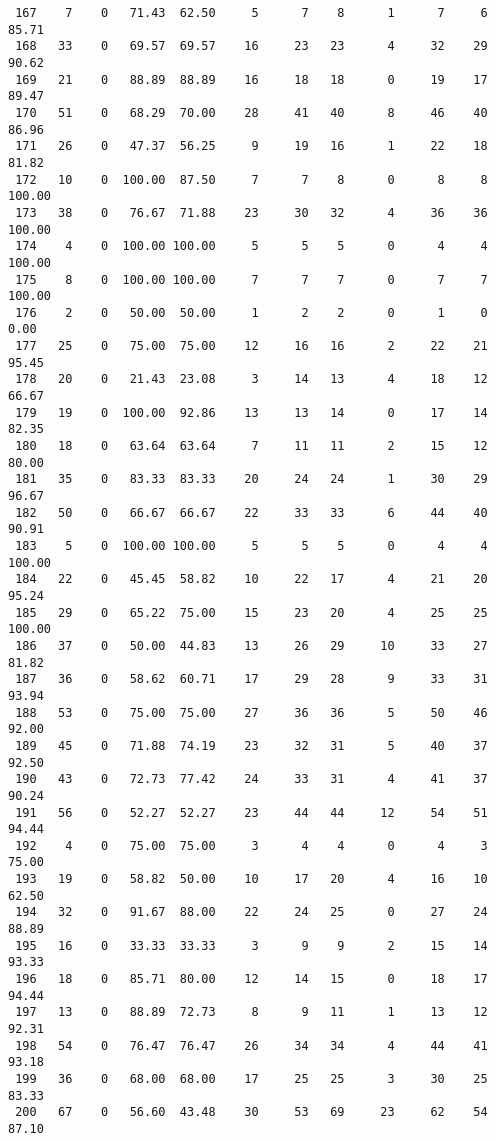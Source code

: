 \begin{verbatim}
 167    7    0   71.43  62.50     5      7    8      1      7     6    85.71
 168   33    0   69.57  69.57    16     23   23      4     32    29    90.62
 169   21    0   88.89  88.89    16     18   18      0     19    17    89.47
 170   51    0   68.29  70.00    28     41   40      8     46    40    86.96
 171   26    0   47.37  56.25     9     19   16      1     22    18    81.82
 172   10    0  100.00  87.50     7      7    8      0      8     8   100.00
 173   38    0   76.67  71.88    23     30   32      4     36    36   100.00
 174    4    0  100.00 100.00     5      5    5      0      4     4   100.00
 175    8    0  100.00 100.00     7      7    7      0      7     7   100.00
 176    2    0   50.00  50.00     1      2    2      0      1     0     0.00
 177   25    0   75.00  75.00    12     16   16      2     22    21    95.45
 178   20    0   21.43  23.08     3     14   13      4     18    12    66.67
 179   19    0  100.00  92.86    13     13   14      0     17    14    82.35
 180   18    0   63.64  63.64     7     11   11      2     15    12    80.00
 181   35    0   83.33  83.33    20     24   24      1     30    29    96.67
 182   50    0   66.67  66.67    22     33   33      6     44    40    90.91
 183    5    0  100.00 100.00     5      5    5      0      4     4   100.00
 184   22    0   45.45  58.82    10     22   17      4     21    20    95.24
 185   29    0   65.22  75.00    15     23   20      4     25    25   100.00
 186   37    0   50.00  44.83    13     26   29     10     33    27    81.82
 187   36    0   58.62  60.71    17     29   28      9     33    31    93.94
 188   53    0   75.00  75.00    27     36   36      5     50    46    92.00
 189   45    0   71.88  74.19    23     32   31      5     40    37    92.50
 190   43    0   72.73  77.42    24     33   31      4     41    37    90.24
 191   56    0   52.27  52.27    23     44   44     12     54    51    94.44
 192    4    0   75.00  75.00     3      4    4      0      4     3    75.00
 193   19    0   58.82  50.00    10     17   20      4     16    10    62.50
 194   32    0   91.67  88.00    22     24   25      0     27    24    88.89
 195   16    0   33.33  33.33     3      9    9      2     15    14    93.33
 196   18    0   85.71  80.00    12     14   15      0     18    17    94.44
 197   13    0   88.89  72.73     8      9   11      1     13    12    92.31
 198   54    0   76.47  76.47    26     34   34      4     44    41    93.18
 199   36    0   68.00  68.00    17     25   25      3     30    25    83.33
 200   67    0   56.60  43.48    30     53   69     23     62    54    87.10

\end{verbatim}
